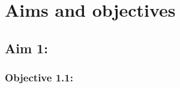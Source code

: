 \chapter{Aims and objectives}
\label{ch:researchplan}


\section{Aim 1: }
\label{sec:aim1}

\subsection{Objective 1.1: }
\label{subsec:aim1obj}


